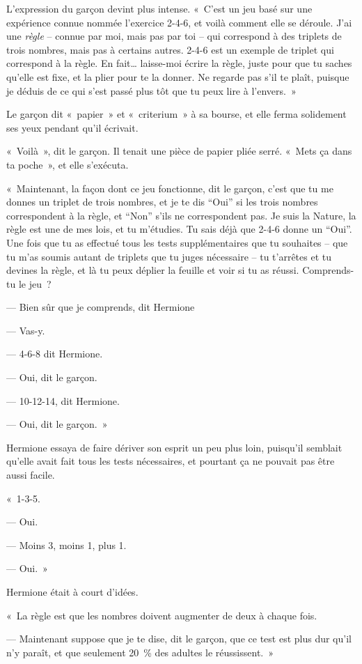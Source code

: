 L'expression du garçon devint plus intense. «~C'est un jeu basé sur une expérience connue nommée l'exercice 2-4-6, et voilà comment elle se déroule. J'ai une \emph{règle} -- connue par moi, mais pas par toi -- qui correspond à des triplets de trois nombres, mais pas à certains autres. 2-4-6 est un exemple de triplet qui correspond à la règle. En fait… laisse-moi écrire la règle, juste pour que tu saches qu'elle est fixe, et la plier pour te la donner. Ne regarde pas s'il te plaît, puisque je déduis de ce qui s'est passé plus tôt que tu peux lire à l'envers.~»

Le garçon dit «~papier~» et «~criterium~» à sa bourse, et elle ferma solidement ses yeux pendant qu'il écrivait.

«~Voilà~», dit le garçon. Il tenait une pièce de papier pliée serré. «~Mets ça dans ta poche~», et elle s'exécuta.

«~Maintenant, la façon dont ce jeu fonctionne, dit le garçon, c'est que tu me donnes un triplet de trois nombres, et je te dis “Oui” si les trois nombres correspondent à la règle, et “Non” s'ils ne correspondent pas. Je suis la Nature, la règle est une de mes lois, et tu m'étudies. Tu sais déjà que 2-4-6 donne un “Oui”. Une fois que tu as effectué tous les tests supplémentaires que tu souhaites -- que tu m'as soumis autant de triplets que tu juges nécessaire -- tu t'arrêtes et tu devines la règle, et là tu peux déplier la feuille et voir si tu as réussi. Comprends-tu le jeu~?

--- Bien sûr que je comprends, dit Hermione

--- Vas-y.

--- 4-6-8 dit Hermione.

--- Oui, dit le garçon.

--- 10-12-14, dit Hermione.

--- Oui, dit le garçon.~»

Hermione essaya de faire dériver son esprit un peu plus loin, puisqu'il semblait qu'elle avait fait tous les tests nécessaires, et pourtant ça ne pouvait pas être aussi facile.

«~1-3-5.

--- Oui.

--- Moins 3, moins 1, plus 1.

--- Oui.~»

Hermione était à court d'idées.

«~La règle est que les nombres doivent augmenter de deux à chaque fois.

--- Maintenant suppose que je te dise, dit le garçon, que ce test est plus dur qu'il n'y paraît, et que seulement 20~\% des adultes le réussissent.~»

